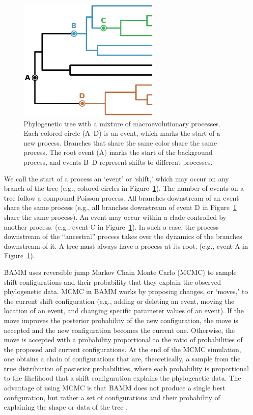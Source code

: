 \documentclass[12pt]{article}
\begin{document}
\begin{figure}
\begin{center}
\includegraphics[width=7cm]{tree.pdf}
\end{center}
\caption{Phylogenetic tree with a mixture of macroevolutionary processes.
    Each colored circle (A--D) is an event,
    which marks the start of a new process.
    Branches that share the same color share the same process.
    The root event (A) marks the start of the background process,
    and events B--D represent shifts to different processes.}
\label{fig:tree}
\end{figure}


We call the start of a process an `event' or `shift,'
which may occur on any branch of the tree
(e.g., colored circles in Figure~\ref{fig:tree}).
%
The number of events on a tree follow a compound Poisson process.
%
All branches downstream of an event share the same process
(e.g., all branches downstream of event D
in Figure~\ref{fig:tree} share the same process).
%
An event may occur within a clade controlled by another process.
(e.g., event C in Figure~\ref{fig:tree}).
%
In such a case, the process downstream of the ``ancestral'' process
takes over the dynamics of the branches downstream of it.
%
A tree must always have a process at its root.
(e.g., event A in Figure~\ref{fig:tree}).


BAMM uses reversible jump Markov Chain Monte Carlo (MCMC)
to sample shift configurations and their probability
that they explain the observed phylogenetic data.
%
MCMC in BAMM works by proposing changes, or `moves,'
to the current shift configuration
(e.g., adding or deleting an event,
moving the location of an event,
and changing specific parameter values of an event).
%
If the move improves the posterior probability of the new configuration,
the move is accepted and the new configuration becomes the current one.
%
Otherwise, the move is accepted with a probability proportional
to the ratio of probabilities of the proposed and current configurations.
%
At the end of the MCMC simulation, one obtains a chain of configurations
that are, theoretically, a sample from the true distribution
of posterior probabilities,
where each probability is proportional to the likelihood
that a shift configuration explains the phylogenetic data.
%
The advantage of using MCMC
is that BAMM does not produce a single best configuration,
but rather a set of configurations and their probability
of explaining the shape or data of the tree \citep{rab14plos}.
\end{document}
